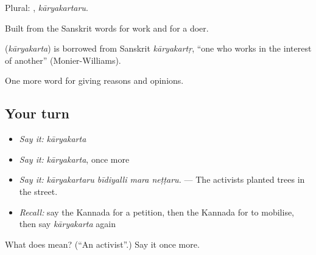 Plural: , \emph{kāryakartaru}.

Built from the Sanskrit words for work and for a doer.

\begin{cousinweb}
\textbf{} (\emph{kāryakarta}) is borrowed from Sanskrit \emph{kāryakartṛ}, \textquotedblleft{}one who works in the interest of another\textquotedblright{} (Monier-Williams).
\end{cousinweb}

\begin{grammarlens}[title={What you've built}]
One more word for giving reasons and opinions.
\end{grammarlens}

\subsection*{Your turn}
\begin{itemize}
\raggedright
  \item \emph{Say it:} \emph{kāryakarta}
  \item \emph{Say it:} \emph{kāryakarta}, once more
  \item \emph{Say it:} \emph{kāryakartaru bīdiyalli mara neṭṭaru.} — The activists planted trees in the street.
  \item \emph{Recall:} say the Kannada for a petition, then the Kannada for to mobilise, then say \emph{kāryakarta} again
\end{itemize}

\begin{tcolorbox}[breakable,colback=teal!4,colframe=teal!35!black,title={Before you move on}]
What does  mean? (\textquotedblleft{}An activist\textquotedblright{}.) Say it once more.
\end{tcolorbox}
